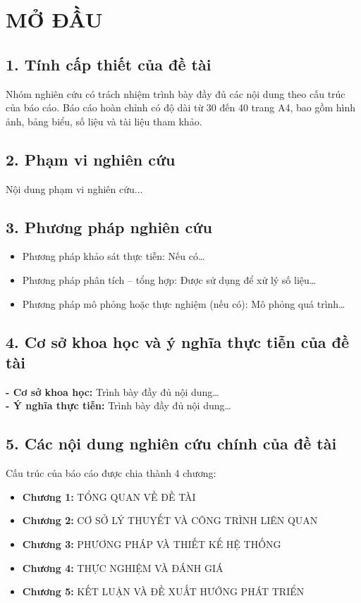 \chapter*{MỞ ĐẦU}

\section*{1. Tính cấp thiết của đề tài}
Nhóm nghiên cứu có trách nhiệm trình bày đầy đủ các nội dung theo cấu trúc của báo cáo. Báo cáo hoàn chỉnh có độ dài từ 30 đến 40 trang A4, bao gồm hình ảnh, bảng biểu, số liệu và tài liệu tham khảo.

\section*{2. Phạm vi nghiên cứu}
Nội dung phạm vi nghiên cứu...

\section*{3. Phương pháp nghiên cứu}
\begin{itemize}
    \item Phương pháp khảo sát thực tiễn: Nếu có\ldots
    \item Phương pháp phân tích -- tổng hợp: Được sử dụng để xử lý số liệu\ldots
    \item Phương pháp mô phỏng hoặc thực nghiệm (nếu có): Mô phỏng quá trình\ldots
\end{itemize}

\section*{4. Cơ sở khoa học và ý nghĩa thực tiễn của đề tài}
\textbf{- Cơ sở khoa học:} Trình bày đầy đủ nội dung\ldots\\
\textbf{- Ý nghĩa thực tiễn:} Trình bày đầy đủ nội dung\ldots

\section*{5. Các nội dung nghiên cứu chính của đề tài}
Cấu trúc của báo cáo được chia thành 4 chương:
\begin{itemize}
    \item \textbf{Chương 1:} TỔNG QUAN VỀ ĐỀ TÀI
    \item \textbf{Chương 2:} CƠ SỞ LÝ THUYẾT VÀ CÔNG TRÌNH LIÊN QUAN
    \item \textbf{Chương 3:} PHƯƠNG PHÁP VÀ THIẾT KẾ HỆ THỐNG
    \item \textbf{Chương 4:} THỰC NGHIỆM VÀ ĐÁNH GIÁ
    \item \textbf{Chương 5:} KẾT LUẬN VÀ ĐỀ XUẤT HƯỚNG PHÁT TRIỂN
\end{itemize}%
